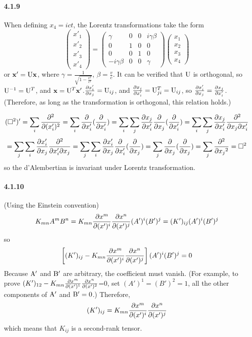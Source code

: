 \documentclass[a4paper]{article}
\begin{document}
\paragraph{4.1.9}
When defining $x_4=ict$, the Lorentz transformations take the form
\[
\begin{pmatrix}
x'_1\\x'_2\\x'_3\\x'_4
\end{pmatrix}=
\begin{pmatrix}
\gamma&0&0&i\gamma\beta\\
0&1&0&0\\
0&0&1&0\\
-i\gamma\beta&0&0&\gamma
\end{pmatrix}
\begin{pmatrix}
x_1\\x_2\\x_3\\x_4
\end{pmatrix}
\]
or $\mathbf{x'}=\mathrm{U}\mathbf{x}$, where $\gamma=\frac{1}{\sqrt{1-\frac{v^2}{c^2}}}$, $\beta=\frac{v}{c}$. It can be verified that $\mathrm{U}$ is orthogonal, so $\mathrm{U}^{-1}=\mathrm{U}^T$, and $\mathbf{x}=\mathrm{U}^T\mathbf{x'}$.\quad $\frac{\partial x'_i}{\partial x_j}=\mathrm{U}_{ij}$, and $\frac{\partial x_j}{\partial x'_i}=\mathrm{U}^T_{ji}=\mathrm{U}_{ij}$, so $\frac{\partial x'_i}{\partial x_j}=\frac{\partial x_j}{\partial x'_i}$. (Therefore, as long as the transformation is orthogonal, this relation holds.)

\[
({\square}^2)'=\sum_i\frac{\partial^2}{\partial(x'_i)^2}=\sum_i\frac{\partial}{\partial x'_i}(\frac{\partial}{\partial x'_i})=\sum_i\sum_j\frac{\partial x_j}{\partial x'_i}\frac{\partial}{\partial x_j}(\frac{\partial}{\partial x'_i})=\sum_i\sum_j\frac{\partial x_j}{\partial x'_i}\frac{\partial^2}{\partial x_j\partial x'_i}
\]
\[
=\sum_j\sum_i\frac{\partial x'_i}{\partial x_j}\frac{\partial^2}{\partial x'_i\partial x_j}=\sum_j\sum_i\frac{\partial x'_i}{\partial x_j}\frac{\partial}{\partial x'_i}(\frac{\partial}{\partial x_j})=\sum_j\frac{\partial}{\partial x_j}(\frac{\partial}{\partial x_j})=\sum_j\frac{\partial^2}{\partial{x_j}^2}={\square}^2
\]
so the d’Alembertian is invariant under Lorentz transformation.

\paragraph{4.1.10}
(Using the Einstein convention)
\[
K_{mn}A^mB^n=K_{mn}\frac{\partial x^m}{\partial(x')^i}\frac{\partial x^n}{\partial(x')^j}(A')^i(B')^j=(K')_{ij}(A')^i(B')^j
\]
so
\[
\left[(K')_{ij}-K_{mn}\frac{\partial x^m}{\partial(x')^i}\frac{\partial x^n}{\partial(x')^j} \right](A')^i(B')^j=0
\]
Because $\mathrm{A'}$ and $\mathrm{B'}$ are arbitrary, the coefficient must vanish. (For example, to prove $(K')_{12}-K_{mn}\frac{\partial x^m}{\partial(x')^1}\frac{\partial x^n}{\partial(x')^2}$=0, set $(A')^1=(B')^2=1$, all the other components of $\mathrm{A'}$ and $\mathrm{B'}=0$.) Therefore,
\[
(K')_{ij}=K_{mn}\frac{\partial x^m}{\partial(x')^i}\frac{\partial x^n}{\partial(x')^j}
\]
which means that $K_{ij}$ is a second-rank tensor.
\end{document}
